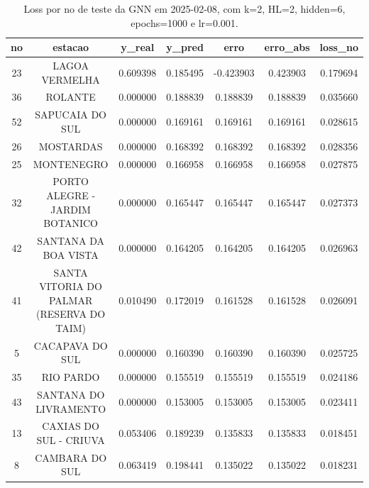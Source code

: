 \begin{table}[h]
\centering
\caption{Loss por no de teste da GNN em 2025-02-08, com k=2, HL=2, hidden=6, epochs=1000 e lr=0.001.}
\label{tab:gnn_loss_k2_hl2_h6_e1000_d20250208}
\begin{tabular}{ccccccc}
\toprule
no & estacao & y\_real & y\_pred & erro & erro\_abs & loss\_no \\
\midrule
23 & LAGOA VERMELHA & 0.609398 & 0.185495 & -0.423903 & 0.423903 & 0.179694 \\
36 & ROLANTE & 0.000000 & 0.188839 & 0.188839 & 0.188839 & 0.035660 \\
52 & SAPUCAIA DO SUL & 0.000000 & 0.169161 & 0.169161 & 0.169161 & 0.028615 \\
26 & MOSTARDAS & 0.000000 & 0.168392 & 0.168392 & 0.168392 & 0.028356 \\
25 & MONTENEGRO & 0.000000 & 0.166958 & 0.166958 & 0.166958 & 0.027875 \\
32 & PORTO ALEGRE - JARDIM BOTANICO & 0.000000 & 0.165447 & 0.165447 & 0.165447 & 0.027373 \\
42 & SANTANA DA BOA VISTA & 0.000000 & 0.164205 & 0.164205 & 0.164205 & 0.026963 \\
41 & SANTA VITORIA DO PALMAR (RESERVA DO TAIM) & 0.010490 & 0.172019 & 0.161528 & 0.161528 & 0.026091 \\
5 & CACAPAVA DO SUL & 0.000000 & 0.160390 & 0.160390 & 0.160390 & 0.025725 \\
35 & RIO PARDO & 0.000000 & 0.155519 & 0.155519 & 0.155519 & 0.024186 \\
43 & SANTANA DO LIVRAMENTO & 0.000000 & 0.153005 & 0.153005 & 0.153005 & 0.023411 \\
13 & CAXIAS DO SUL - CRIUVA & 0.053406 & 0.189239 & 0.135833 & 0.135833 & 0.018451 \\
8 & CAMBARA DO SUL & 0.063419 & 0.198441 & 0.135022 & 0.135022 & 0.018231 \\
\bottomrule
\end{tabular}
\end{table}
